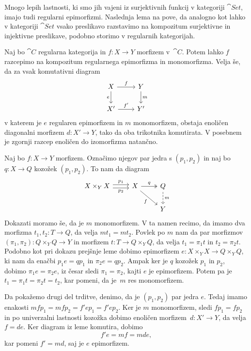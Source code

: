 \documentclass[../kategoricna_logika.tex]{subfiles}
\begin{document}
Mnogo lepih lastnosti, ki smo
jih vajeni iz surjektivnih funkcij v kategoriji $\cat{Set}$, imajo
tudi regularni epimorfizmi.
Naslednja lema na pove, da analogno kot lahko v kategoriji $\cat{Set}$
vsako preslikavo razstavimo na kompozitum surjektivne in
injektivne preslikave, podobno storimo v regularnih kategorijah.
\begin{lema}
  Naj bo $\cat{C}$ regularna kategorija in $f: X \to Y$ morfizem
  v~$\cat{C}$.  Potem lahko $f$ razcepimo na kompozitum regularnega
  epimorfizma in monomorfizma.  Velja še, da za vsak komutativni
  diagram
  \begin{equation*}
    \begin{tikzcd}
      X \ar[d, "e"'] \ar[r, "f"] & Y \ar[d, "m"] \\
      X' \ar[r, "f'"] & Y'
    \end{tikzcd}
  \end{equation*}
  v katerem je $e$ regularen epimorfizem in $m$ monomorfizem, obstaja
  enoličen diagonalni morfizem $d : X' \to Y$, tako da oba trikotnika
  komutirata.  V posebnem je zgornji razcep enoličen do izomorfizma
  natančno.
\end{lema}
\begin{comment}
  \begin{opomba}
    Pokažimo, da zgornja trditev res pomeni, da so slike morfizmov
    enolične.
  \end{opomba}
\end{comment}
\begin{dokaz}
  Naj bo $f : X \to Y$ morfizem.  Označimo njegov par jedra s
  $(p_1, p_2)$ in naj bo $q : X \to Q$ kozožek $(p_1, p_2)$.  To nam da
  diagram
  \begin{equation*}
    \begin{tikzcd}
      X \times_Y X \ar[r, shift left, "p_1"] \ar[r, shift right,
      "p_2"'] &
      X \ar[dr, "f"'] \ar[r, two heads, "q"] & Q \ar[d, dashed, "m"] \\
      & & Y
    \end{tikzcd}
  \end{equation*}
  Dokazati moramo še, da je $m$ monomorfizem. V ta namen recimo, da
  imamo dva morfizma $t_1, t_2 : T \to Q$, da velja $m t_1 = m
  t_2$. Povlek po $m$ nam da par morfizmov
  $(\pi_1, \pi_2) : Q \times_Y Q \to Y$ in morfizem
  $t : T \to Q \times_Y Q$, da velja $t_1 = \pi_1 t$ in
  $t_2 = \pi_2 t$.  Podobno kot pri dokazu prejšnje leme dobimo
  epimorfizem $e : X \times_Y X \to Q \times_Y Q$, ki nam da enačbi
  $p_1 e = q p_1$ in $\pi_2 e = q p_2$.  Ampak ker je $q$ kozožek
  $p_1$ in $p_2$, dobimo $\pi_1 e = \pi_2 e$, iz česar sledi
  $\pi_1 = \pi_2$, kajti $e$ je epimorfizem.  Potem pa je
  $t_1 = \pi_1 t = \pi_2 t = t_2$, kar pomeni, da je~$m$ res
  monomorfizem.

  Da pokažemo drugi del trditve, denimo, da je $(p_1, p_2)$ par jedra
  $e$.  Tedaj imamo enakosti
  $m f p_1 = m f p_2 = f' e p_1 = f' e p_2$.  Ker je $m$ monomorfizem,
  sledi $f p_1 = f p_2$ in po univerzalni lastnosti kozožka dobimo
  enoličen morfizem~$d : X' \to Y$, da velja $f = d e$. Ker diagram
  iz leme komutira, dobimo
  \[f' e = m f = m d e, \] kar pomeni $f' = m d$, saj je $e$
  epimorfizem.
\end{dokaz}
\end{document}
